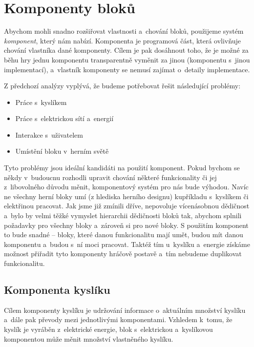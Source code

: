 


\section{Komponenty bloků}
\label{sec:komponents}

Abychom mohli snadno rozšiřovat vlastnosti a~chování bloků, použijeme systém \textit{komponent}, který nám \UE{} nabízí. Komponenta je programová část, která ovlivňuje chování vlastníka dané komponenty. Cílem je pak dosáhnout toho, že je možné za běhu hry jednu komponentu transparentně vyměnit za jinou (komponentu s~jinou implementací), a~vlastník komponenty se nemusí zajímat o~detaily implementace.

Z předchozí analýzy vyplývá, že budeme potřebovat řešit následující problémy:

\begin{itemize}
	\item Práce s~kyslíkem
	\item Práce s~elektrickou sítí a~energií
	\item Interakce s~uživatelem
	\item Umístění bloku v~herním světě
\end{itemize}


Tyto problémy jsou ideální kandidáti na použití komponent. Pokud bychom se někdy v~budoucnu rozhodli upravit chování některé funkcionality či jej z~libovolného důvodu měnit, komponentový systém pro nás bude výhodou. Navíc ne všechny herní bloky umí (z hlediska herního designu) kupříkladu s~kyslíkem či elektřinou pracovat. Jak jsme již zmínili dříve, \UE{} nepovoluje vícenásobnou dědičnost a~bylo by velmi těžké vymyslet hierarchii dědičnosti bloků tak, abychom splnili požadavky pro všechny bloky a~zároveň si  pro nové bloky. S použitím komponent to bude snadné -- bloky, které danou funkcionalitu mají umět, budou mít danou komponentu a~budou s~ní moci pracovat. Taktéž tím u~kyslíku a~energie získáme možnost přiřadit tyto komponenty hráčově postavě a~tím nebudeme duplikovat funkcionalitu.

\subsection{Komponenta kyslíku}

Cílem komponenty kyslíku je udržování informace o~aktuálním množství \linebreak {} kyslíku a~dále pak převody mezi jednotlivými komponentami. Vzhledem k~tomu, že kyslík je vyráběn z~elektrické energie, blok s~elektrickou a~kyslíkovou komponentou může měnit množství vlastněného kyslíku. 

